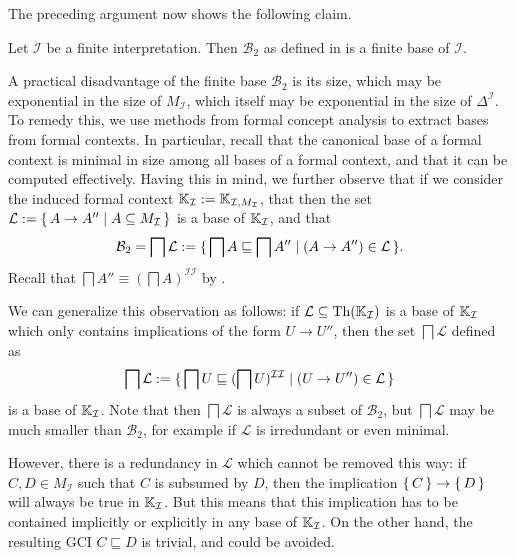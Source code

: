 The preceding argument now shows the following claim.

\begin{Theorem}
  \label{thm:Felix-base-B2}
  Let $\mathcal{I}$ be a finite interpretation.  Then $\mathcal{B}_2$ as defined in
   is a finite base of $\mathcal{I}$.
\end{Theorem}

A practical disadvantage of the finite base $\mathcal{B}_2$ is its size, which may be
exponential in the size of $M_{\mathcal{I}}$, which itself may be exponential in the size
of $\Delta^{\mathcal{I}}$.  To remedy this, we use methods from formal concept analysis to
extract bases from formal contexts.  In particular, recall that the canonical base of a
formal context is minimal in size among all bases of a formal context, and that it can be
computed effectively.  Having this in mind, we further observe that if we consider the
induced formal context ${\mathbb{K}}_{\mathcal{I}} := {\mathbb{K}}_{\mathcal{I}, M_{\mathcal{I}}}$,
that then the set $\mathcal{L} := {\{\, A \to A'' \mid A \subseteq M_{\mathcal{I}} \,\}}$ is a
  base of ${\mathbb{K}}_{\mathcal{I}}$, and that
\begin{equation*}
  \mathcal{B}_2 = \bigsqcap \mathcal{L} := {\{\, \bigsqcap A \sqsubseteq \bigsqcap A''
    \mid (A \to A'') \in \mathcal{L} \,\}}.
\end{equation*}
Recall that $\bigsqcap A'' \equiv (\bigsqcap A)^{\mathcal{I}\mathcal{I}}$ by
.

We can generalize this observation as follows: if $\mathcal{L} \subseteq \operatorname{Th}({\mathbb{K}}_{\mathcal{I}})$ is a base of ${\mathbb{K}}_{\mathcal{I}}$ which only contains implications of
the form $U \to U''$, then the set $\bigsqcap \mathcal{L}$ defined as
\begin{equation*}
  \bigsqcap \mathcal{L} := {\{\, \bigsqcap U \sqsubseteq (\bigsqcap
    U)^{\mathcal{I}\mathcal{I}} \mid (U \to U'') \in \mathcal{L} \,\}}
\end{equation*}
is a base of ${\mathbb{K}}_{\mathcal{I}}$.  Note that then $\bigsqcap \mathcal{L}$ is always a
subset of $\mathcal{B}_2$, but $\bigsqcap \mathcal{L}$ may be much smaller than
$\mathcal{B}_2$, for example if $\mathcal{L}$ is irredundant or even minimal.

However, there is a redundancy in $\mathcal{L}$ which cannot be removed this way: if $C, D
\in M_{\mathcal{I}}$ such that $C$ is subsumed by $D$, then the implication ${\{\, C \,\}} \to
{\ensuremath{\{\, D \,\}}}$ will always be true in ${\mathbb{K}}_{\mathcal{I}}$.  But this means that this
implication has to be contained implicitly or explicitly in any base of ${\mathbb{K}}_{\mathcal{I}}$.  On the other hand, the resulting GCI $C \sqsubseteq D$ is trivial, and
could be avoided.

